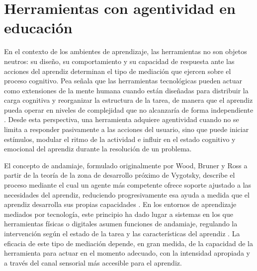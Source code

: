 \documentclass{book}
\begin{document}
\section{Herramientas con agentividad en educación}


En el contexto de los ambientes de aprendizaje, las herramientas  no son objetos neutros: su diseño, su comportamiento y su capacidad de respuesta ante las acciones del aprendiz determinan el tipo de mediación que ejercen sobre el proceso cognitivo. Pea señala que las herramientas tecnológicas pueden actuar como extensiones de la mente humana cuando están diseñadas para distribuir la carga cognitiva y reorganizar la estructura de la tarea, de manera que el aprendiz pueda operar en niveles de complejidad que no alcanzaría de forma independiente \cite{Pea2004}. Desde esta 
perspectiva, una herramienta adquiere agentividad cuando no se 
limita a responder pasivamente a las acciones del usuario, sino 
que puede iniciar estímulos, modular el ritmo de la actividad e 
influir en el estado cognitivo y emocional del aprendiz durante 
la resolución de un problema.

El concepto de andamiaje, formulado originalmente por Wood, Bruner 
y Ross a partir de la teoría de la zona de desarrollo próximo de 
Vygotsky, describe el proceso mediante el cual un agente más 
competente ofrece soporte ajustado a las necesidades del aprendiz, 
reduciendo progresivamente esa ayuda a medida que el aprendiz 
desarrolla sus propias capacidades \cite{Wood1976}. En los entornos 
de aprendizaje mediados por tecnología, este principio ha dado 
lugar a sistemas en los que herramientas físicas o digitales 
asumen funciones de andamiaje, regulando la intervención según 
el estado de la tarea y las características del aprendiz 
\cite{Pea2004}. La eficacia de este tipo de mediación depende, 
en gran medida, de la capacidad de la herramienta para actuar 
en el momento adecuado, con la intensidad apropiada y a través 
del canal sensorial más accesible para el aprendiz.
\end{document}
